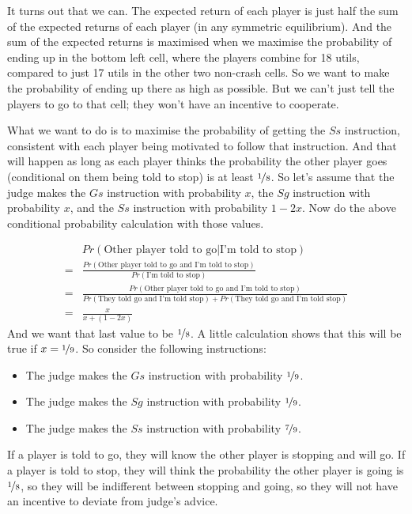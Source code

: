 \documentclass[openany]{book}
\begin{document}
It turns out that we can. The expected return of each player is just half the sum of the expected returns of each player (in any symmetric equilibrium). And the sum of the expected returns is maximised when we maximise the probability of ending up in the bottom left cell, where the players combine for 18 utils, compared to just 17 utils in the other two non-crash cells. So we want to make the probability of ending up there as high as possible. But we can't just tell the players to go to that cell; they won't have an incentive to cooperate. 

What we want to do is to maximise the probability of getting the $Ss$ instruction, consistent with each player being motivated to follow that instruction. And that will happen as long as each player thinks the probability the other player goes (conditional on them being told to stop) is at least $\nicefrac{1}{8}$. So let's assume that the judge makes the $Gs$ instruction with probability $x$, the $Sg$ instruction with probability $x$, and the $Ss$ instruction with probability $1 - 2x$. Now do the above conditional probability calculation with those values.

\begin{align*}
&Pr(\text{Other player told to go}|\text{I'm told to stop}) \\ 
= &\frac{Pr(\text{Other player told to go and I'm told to stop})}{Pr(\text{I'm told to stop})} \\
= &\frac{Pr(\text{Other player told to go and I'm told to stop})}{Pr(\text{They told go and I'm told stop}) + Pr(\text{They told go and I'm told stop})} \\
= &\frac{x}{x + (1-2x)}
\end{align*}
And we want that last value to be $\nicefrac{1}{8}$. A little calculation shows that this will be true if $x = \nicefrac{1}{9}$. So consider the following instructions:

\begin{itemize}
\item The judge makes the $Gs$ instruction with probability $\nicefrac{1}{9}$.
\item The judge makes the $Sg$ instruction with probability $\nicefrac{1}{9}$.
\item The judge makes the $Ss$ instruction with probability $\nicefrac{7}{9}$.
\end{itemize}
If a player is told to go, they will know the other player is stopping and will go. If a player is told to stop, they will think the probability the other player is going is $\nicefrac{1}{8}$, so they will be indifferent between stopping and going, so they will not have an incentive to deviate from judge's advice.
\end{document}
